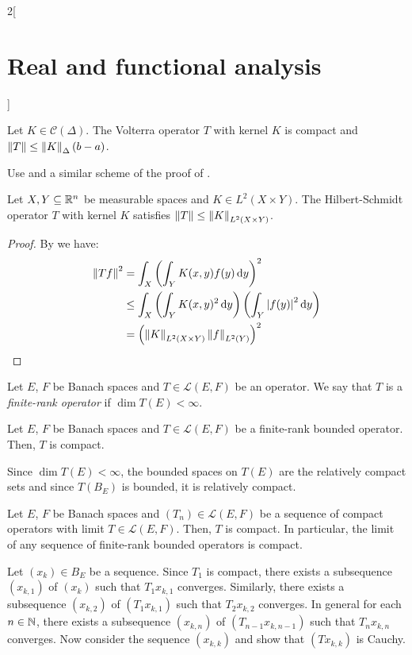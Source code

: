 \documentclass[../../../main_math.tex]{subfiles}
\begin{document}
\begin{multicols}{2}[\section{Real and functional analysis}]
\begin{proposition}
    Let $K\in\mathcal{C}(\Delta)$. The Volterra operator $T$ with kernel $K$ is compact and $\left\|T\right\|\leq\left\|K\right\|_{\Delta}(b-a)$.
  \end{proposition}
  \begin{sproof}
    Use  and a similar scheme of the proof of .
  \end{sproof}
  \begin{proposition}
    Let $X,Y\subseteq \mathbb{R}^n$ be measurable spaces and $K\in L^2(X\times Y)$. The Hilbert-Schmidt operator $T$ with kernel $K$ satisfies $\left\|T\right\|\leq\left\|K\right\|_{L^2(X\times Y)}$.
  \end{proposition}
  \begin{proof}
    By  we have:
    \begin{align*}
      \left\|Tf\right\|^2 & =\int_X{\left(\int_YK(x,y)f(y)\dd{y}\right)}^2                                    \\
                  & \leq \int_X\left(\int_YK(x,y)^2\dd{y}\right)\left(\int_Y\abs{f(y)}^2\dd{y}\right) \\
                  & = {\left(\left\|K\right\|_{L^2(X\times Y)}\left\|f\right\|_{L^2(Y)}\right)}^2
    \end{align*}
  \end{proof}
  \begin{definition}
    Let $E$, $F$ be Banach spaces and $T\in\mathcal{L}(E,F)$ be an operator. We say that $T$ is a \emph{finite-rank operator} if $\dim T(E)<\infty$.
  \end{definition}
  \begin{lemma}\label{RFA:lemmarank}
    Let $E$, $F$ be Banach spaces and $T\in\mathcal{L}(E,F)$ be a finite-rank bounded operator. Then, $T$ is compact.
  \end{lemma}
  \begin{sproof}
    Since $\dim T(E)<\infty$, the bounded spaces on $T(E)$ are the relatively compact sets and since $T(B_E)$ is bounded, it is relatively compact.
  \end{sproof}
  \begin{proposition}
    Let $E$, $F$ be Banach spaces and $(T_n)\in\mathcal{L}(E,F)$ be a sequence of compact operators with limit $T\in\mathcal{L}(E,F)$. Then, $T$ is compact. In particular, the limit of any sequence of finite-rank bounded operators is compact.
  \end{proposition}
  \begin{sproof}
    Let $(x_k)\in B_E$ be a sequence. Since $T_1$ is compact, there exists a subsequence $(x_{k,1})$ of $(x_k)$ such that $T_1x_{k,1}$ converges. Similarly,  there exists a subsequence $(x_{k,2})$ of $(T_1x_{k,1})$ such that $T_2x_{k,2}$ converges. In general for each $n\in\mathbb{N}$, there exists a subsequence $(x_{k,n})$ of $(T_{n-1}x_{k,n-1})$ such that $T_nx_{k,n}$ converges. Now consider the sequence $(x_{k,k})$ and show that $(Tx_{k,k})$ is Cauchy.


\end{sproof}
\end{multicols}
\end{document}
